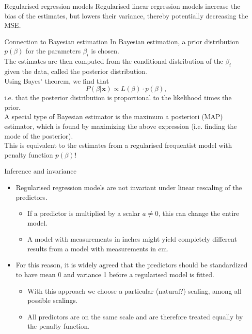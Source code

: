 \documentclass[10pt,handout]{beamer}
\begin{document}
\begin{frame}{Regularised regression models}
Regularised linear regression models increase the {\color{uured}bias} of the estimates, but lowers their {\color{uured}variance}, thereby potentially decreasing the MSE.
\end{frame}

\begin{frame}{Connection to Bayesian estimation}
In Bayesian estimation, a {\color{uured}prior distribution} $p(\beta)$ for the parameters $\beta_i$ is chosen.\\[3mm]\pause
The estimates are then computed from the conditional distribution of the $\beta_i$ given the data, called the {\color{uured}posterior distribution}.\\[3mm]\pause
Using Bayes' theorem, we find that
$$P(\beta|\mathbf{x})\propto L(\beta)\cdot p(\beta),$$
i.e. that the posterior distribution is proportional to the likelihood times the prior.\\[3mm]
A special type of Bayesian estimator is the {\color{uured}maximum a posteriori (MAP)} estimator, which is found by maximizing the above expression (i.e. finding the mode of the posterior).\\[3mm]
This is equivalent to the estimates from a regularised frequentist model with penalty function $p(\beta)$!
\end{frame}

\begin{frame}{Inference and invariance}
\begin{itemize}
\item Regularised regression models are not invariant under linear rescaling of the predictors.\pause
\begin{itemize}
\item If a predictor is multiplied by a scalar $a\neq 0$, this can change the entire model.\pause
\item A model with measurements in inches might yield completely different results from a model with measurements in cm.\\[3mm]\pause
\end{itemize}
\item For this reason, it is widely agreed that the predictors should be standardized to have mean 0 and variance 1 before a regularised model is fitted.\pause
\begin{itemize}
\item With this approach we choose a particular (natural?) scaling, among all possible scalings.\pause
\item All predictors are on the same scale and are therefore treated equally by the penalty function.\pause
\end{itemize}
\end{itemize}
\end{frame}
\end{document}
